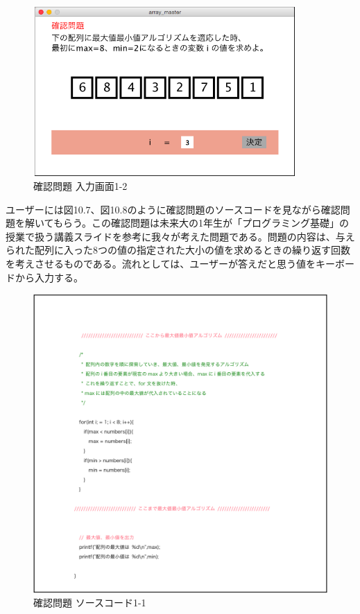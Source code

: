 \documentclass[openany,11pt,papersize]{jsbook}
\begin{document}
\begin{figure}[H]
\begin{center}
\includegraphics[width=10cm, bb=0 0 647 422]{img/9thParagraph/kakuninmondai_02.png}
\end{center}
\caption{確認問題 入力画面1-2}
\end{figure}

ユーザーには図10.7、図10.8のように確認問題のソースコードを見ながら確認問題を解いてもらう。この確認問題は未来大の1年生が「プログラミング基礎」の授業で扱う講義スライドを参考に我々が考えた問題である。問題の内容は、与えられた配列に入った8つの値の指定された大小の値を求めるときの繰り返す回数を考えさせるものである。流れとしては、ユーザーが答えだと思う値をキーボードから入力する。

\begin{figure}[H]
\begin{center}
\includegraphics[width=14cm, bb=0 0 2549 2594]{img/9thParagraph/kakuninmondai_03.png}
\end{center}
\caption{確認問題 ソースコード1-1}
\end{figure}
\end{document}
